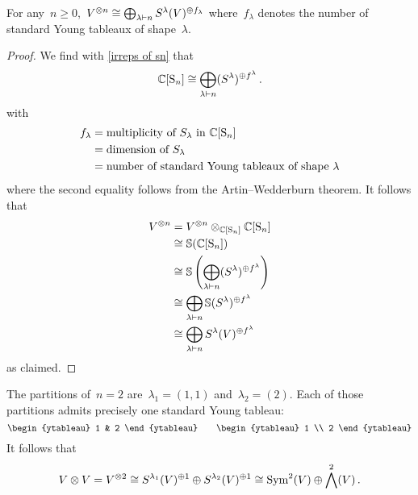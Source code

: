 \documentclass[a4paper,10pt]{scrartcl}
\begin{document}
\begin{corollary}
  For any~$n \geq 0$,~$V^{\otimes n} \cong \bigoplus_{\lambda \vdash n} S^{\lambda}(V)^{\oplus f_\lambda}$ where~$f_\lambda$ denotes the number of standard Young tableaux of shape~$\lambda$.
\end{corollary}


\begin{proof}
  We find with \cref{irreps of sn} that
  \[
    \mathbb{C}[\operatorname{S}_n]
    \cong
    \bigoplus_{\lambda \vdash n} (S^\lambda)^{\oplus f^\lambda} \,.
  \]
  with
  \begin{align*}
    f_\lambda
    &=
    \text{multiplicity of~$S_\lambda$ in~$\mathbb{C}[\operatorname{S}_n]$}
    \\
    &=
    \text{dimension of~$S_\lambda$}
    \\
    &=
    \text{number of standard Young tableaux of shape~$\lambda$}
  \end{align*}
  where the second equality follows from the Artin--Wedderburn theorem.
  It follows that
  \begin{align*}
    V^{\otimes n}
    &=
    V^{\otimes n} \otimes_{\mathbb{C}[\operatorname{S}_n]} \mathbb{C}[\operatorname{S}_n]
    \\
    &\cong
    \mathbb{S}(\mathbb{C}[\operatorname{S}_n])
    \\
    &\cong
    \mathbb{S}\left( \bigoplus_{\lambda \vdash n} (S^\lambda)^{\oplus f^\lambda} \right)
    \\
    &\cong
    \bigoplus_{\lambda \vdash n} \mathbb{S}(S^\lambda)^{\oplus f^\lambda}
    \\
    &\cong
    \bigoplus_{\lambda \vdash n} S^{\lambda}(V)^{\oplus f^\lambda}
  \end{align*}
  as claimed.
\end{proof}


\begin{example}
  The partitions of~$n = 2$ are~$\lambda_1 = (1,1)$ and~$\lambda_2 = (2)$.
  Each of those partitions admits precisely one standard Young tableau:
  \[
    \begin{ytableau}
      1 & 2
    \end{ytableau}
    \qquad
    \begin{ytableau}
      1 \\
      2
    \end{ytableau}
  \]
  It follows that
  \[
    V \otimes V
    =
    V^{\otimes 2}
    \cong
    S^{\lambda_1}(V)^{\oplus 1}
    \oplus
    S^{\lambda_2}(V)^{\oplus 1}
    \cong
    \operatorname{Sym}^2(V) \oplus \bigwedge^2(V) \,.
  \]
\end{example}
\end{document}

